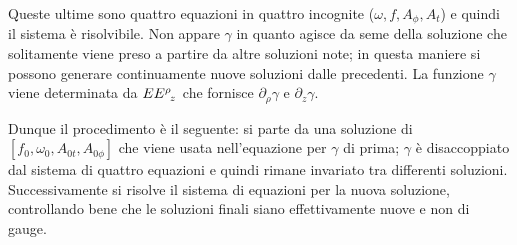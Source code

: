 Queste ultime sono quattro equazioni in quattro incognite ($\omega, f, A_\phi, A_t$) e quindi il sistema è risolvibile. Non appare $\gamma$ in quanto agisce da seme della soluzione che solitamente viene preso a partire da altre soluzioni note; in questa maniere si possono generare continuamente nuove soluzioni dalle precedenti. La funzione $\gamma$ viene determinata da $\tensor{EE}{^\rho_z}$ che fornisce $\partial_\rho \gamma$ e $\partial_z \gamma$.

Dunque il procedimento è il seguente: si parte da una soluzione di $[f_0, \omega_0, A_{0t}, A_{0\phi}]$ che viene usata nell'equazione per $\gamma$ di prima; $\gamma$ è disaccoppiato dal sistema di quattro equazioni e quindi rimane invariato tra differenti soluzioni. Successivamente si risolve il sistema di equazioni per la nuova soluzione, controllando bene che le soluzioni finali siano effettivamente nuove e non di gauge.


